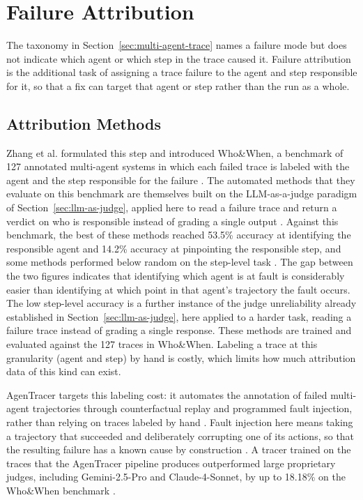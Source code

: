 \section{Failure Attribution}
\label{sec:failure-attribution}

The taxonomy in Section~\ref{sec:multi-agent-trace} names a failure mode but does not indicate which agent or which step in the trace caused it. Failure attribution is the additional task of assigning a trace failure to the agent and step responsible for it, so that a fix can target that agent or step rather than the run as a whole.

\subsection{Attribution Methods}
\label{sec:attribution-methods}

Zhang et al. formulated this step and introduced Who\&When, a benchmark of 127 annotated multi-agent systems in which each failed trace is labeled with the agent and the step responsible for the failure \cite{zhangWhichAgentCauses2025}. The automated methods that they evaluate on this benchmark are themselves built on the LLM-as-a-judge paradigm of Section~\ref{sec:llm-as-judge}, applied here to read a failure trace and return a verdict on who is responsible instead of grading a single output \cite{zhangWhichAgentCauses2025}. Against this benchmark, the best of these methods reached 53.5\% accuracy at identifying the responsible agent and 14.2\% accuracy at pinpointing the responsible step, and some methods performed below random on the step-level task \cite{zhangWhichAgentCauses2025}. The gap between the two figures indicates that identifying which agent is at fault is considerably easier than identifying at which point in that agent's trajectory the fault occurs. The low step-level accuracy is a further instance of the judge unreliability already established in Section~\ref{sec:llm-as-judge}, here applied to a harder task, reading a failure trace instead of grading a single response. These methods are trained and evaluated against the 127 traces in Who\&When. Labeling a trace at this granularity (agent and step) by hand is costly, which limits how much attribution data of this kind can exist.

AgenTracer targets this labeling cost: it automates the annotation of failed multi-agent trajectories through counterfactual replay and programmed fault injection, rather than relying on traces labeled by hand \cite{zhangAgenTracerWhoInducing2025}. Fault injection here means taking a trajectory that succeeded and deliberately corrupting one of its actions, so that the resulting failure has a known cause by construction \cite{zhangAgenTracerWhoInducing2025}. A tracer trained on the traces that the AgenTracer pipeline produces outperformed large proprietary judges, including Gemini-2.5-Pro and Claude-4-Sonnet, by up to 18.18\% on the Who\&When benchmark \cite{zhangAgenTracerWhoInducing2025}.

